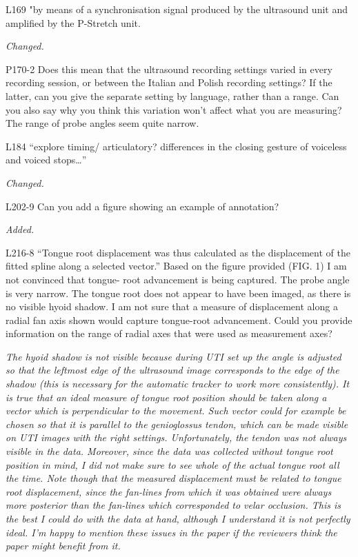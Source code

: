 \documentclass[]{article}
\begin{document}
L169 "by means of a synchronisation signal produced by the ultrasound
unit and amplified by the P-Stretch unit.

\begin{adjustwidth}{1cm}{} \textit{
Changed.
} \end{adjustwidth}

P170-2 Does this mean that the ultrasound recording settings varied in
every recording session, or between the Italian and Polish recording
settings? If the latter, can you give the separate setting by language,
rather than a range. Can you also say why you think this variation won't
affect what you are measuring? The range of probe angles seem quite
narrow.

L184 ``explore timing/ articulatory? differences in the closing gesture
of voiceless and voiced stops\ldots{}''

\begin{adjustwidth}{1cm}{} \textit{
Changed.
} \end{adjustwidth}

L202-9 Can you add a figure showing an example of annotation?

\begin{adjustwidth}{1cm}{} \textit{
Added.
} \end{adjustwidth}

L216-8 ``Tongue root displacement was thus calculated as the
displacement of the fitted spline along a selected vector.'' Based on
the figure provided (FIG. 1) I am not convinced that tongue- root
advancement is being captured. The probe angle is very narrow. The
tongue root does not appear to have been imaged, as there is no visible
hyoid shadow. I am not sure that a measure of displacement along a
radial fan axis shown would capture tongue-root advancement. Could you
provide information on the range of radial axes that were used as
measurement axes?

\begin{adjustwidth}{1cm}{} \textit{
The hyoid shadow is not visible because during UTI set up the angle is adjusted so that the leftmost edge of the ultrasound image corresponds to the edge of the shadow (this is necessary for the automatic tracker to work more consistently). It is true that an ideal measure of tongue root position should be taken along a vector which is perpendicular to the movement. Such vector could for example be chosen so that it is parallel to the genioglossus tendon, which can be made visible on UTI images with the right settings. Unfortunately, the tendon was not always visible in the data. Moreover, since the data was collected without tongue root position in mind, I did not make sure to see whole of the actual tongue root all the time. Note though that the measured displacement must be related to tongue root displacement, since the fan-lines from which it was obtained were always more posterior than the fan-lines which corresponded to velar occlusion. This is the best I could do with the data at hand, although I understand it is not perfectly ideal. I'm happy to mention these issues in the paper if the reviewers think the paper might benefit from it.
} \end{adjustwidth}
\end{document}
